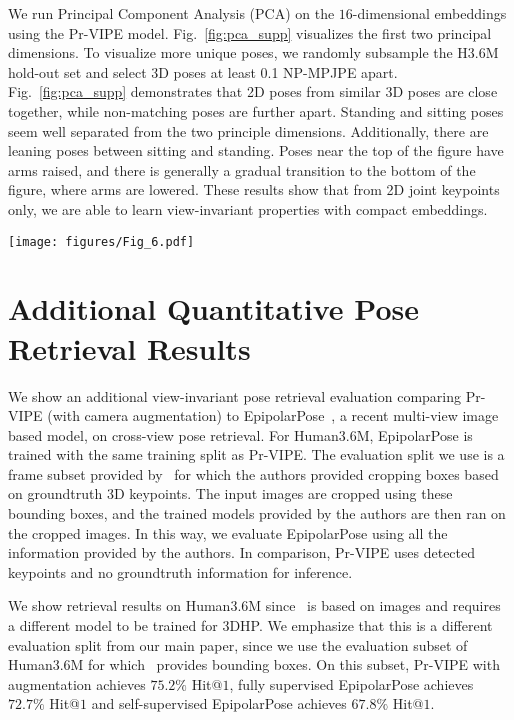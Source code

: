  We run Principal Component Analysis (PCA) on the $16$-dimensional embeddings using the Pr-VIPE model. Fig.~\ref{fig:pca_supp} visualizes the first two principal dimensions. To visualize more unique poses, we randomly subsample the H3.6M hold-out set and select 3D poses at least 0.1 NP-MPJPE apart. Fig.~\ref{fig:pca_supp} demonstrates that 2D poses from similar 3D poses are close together, while non-matching poses are further apart. Standing and sitting poses seem well separated from the two principle dimensions. Additionally, there are leaning poses between sitting and standing. Poses near the top of the figure have arms raised, and there is generally a gradual transition to the bottom of the figure, where arms are lowered. These results show that from 2D joint keypoints only, we are able to learn view-invariant properties with compact embeddings.

\begin{figure*}[t!]
  \centering
  \texttt{[image: figures/Fig\_6.pdf]}
  \caption{Visualization of Pr-VIPE space with 2D poses in the H3.6M hold-out subset using the first two PCA dimensions.}
  \label{fig:pca_supp}
  \vspace{-0.3cm}
\end{figure*}


\section{Additional Quantitative Pose Retrieval Results}\label{sec:additional_comp}

We show an additional view-invariant pose retrieval evaluation comparing Pr-VIPE (with camera augmentation) to EpipolarPose~\cite{kocabas2019self}, a recent multi-view image based model, on cross-view pose retrieval. For Human3.6M, EpipolarPose is trained with the same training split as Pr-VIPE. The evaluation split we use is a frame subset provided by~\cite{kocabas2019self} for which the authors provided cropping boxes based on groundtruth 3D keypoints. The input images are cropped using these bounding boxes, and the trained models provided by the authors are then ran on the cropped images. In this way, we evaluate EpipolarPose using all the information provided by the authors. In comparison, Pr-VIPE uses detected keypoints and no groundtruth information for inference.

We show retrieval results on Human3.6M since~\cite{kocabas2019self} is based on images and requires a different model to be trained for 3DHP. We emphasize that this is a different evaluation split from our main paper, since we use the evaluation subset of Human3.6M for which~\cite{kocabas2019self} provides bounding boxes. On this subset, Pr-VIPE with augmentation achieves $75.2\%$ Hit@$1$, fully supervised EpipolarPose achieves $72.7\%$ Hit@$1$ and self-supervised EpipolarPose achieves $67.8\%$ Hit@$1$.

